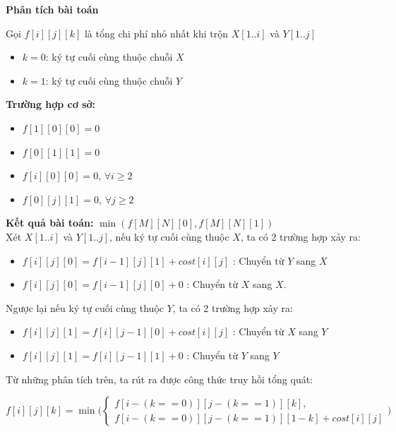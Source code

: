 \textbf{Phân tích bài toán}

Gọi $f[i][j][k]$ là tổng chi phí nhỏ nhất khi trộn $X[1..i]$ và $Y[1..j]$
\begin{itemize}
    \item $k = 0$: ký tự cuối cùng thuộc chuỗi $X$
    \item $k = 1$: ký tự cuối cùng thuộc chuỗi $Y$
\end{itemize} 

\textbf{Trường hợp cơ sở:}
\begin{itemize}
    \item $f[1][0][0] = 0$
    \item $f[0][1][1] = 0$
    \item $f[i][0][0] = 0$, $\forall i \geq 2$
    \item $f[0][j][1] = 0$, $\forall j \geq 2$
\end{itemize}

\textbf{Kết quả bài toán:} $\min(f[M][N][0], f[M][N][1])$\\

Xét $X[1..i]$ và $Y[1..j]$, nếu ký tự cuối cùng thuộc $X$, ta có 2 trường hợp xảy ra:

\begin{itemize}
    \item $f[i][j][0] = f[i - 1][j][1] + cost[i][j]$ : Chuyển từ $Y$ sang $X$ 
    \item $f[i][j][0] = f[i - 1][j][0] + 0$ : Chuyển từ $X$ sang $X$.
\end{itemize}
    
Ngược lại nếu ký tự cuối cùng thuộc $Y$, ta có 2 trường hợp xảy ra:
\begin{itemize}
    \item $f[i][j][1] = f[i][j - 1][0] + cost[i][j]$ : Chuyển từ $X$ sang $Y$
    \item $f[i][j][1] = f[i][j - 1][1] + 0$ : Chuyển từ $Y$ sang $Y$
\end{itemize}

Từ những phân tích trên, ta rút ra được công thức truy hồi tổng quát:


\[
f[i][j][k] = \min \Big( 
    \begin{cases}
        f[i - (k == 0)][j - (k == 1)][k], \\
        f[i - (k == 0)][j - (k == 1)][1 - k] + cost[i][j]
    \end{cases}
    \Big)
\]


